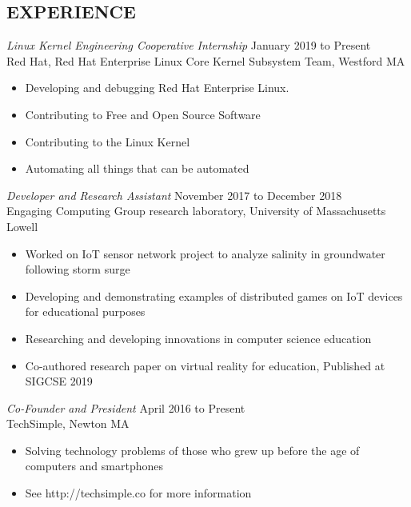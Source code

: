 \documentclass[margin]{res}
\begin{document}
\begin{resume}
\section{EXPERIENCE} {\sl Linux Kernel Engineering Cooperative Internship} \hfill January 2019 to Present\\
                Red Hat, 
                Red Hat Enterprise Linux Core Kernel Subsystem Team, Westford MA
                 \begin{itemize}  \itemsep -2pt %
                 \item Developing and debugging Red Hat Enterprise Linux. 
                \item   Contributing to Free and Open Source Software
                \item Contributing to the Linux Kernel
                \item Automating all things that can be automated
                \end{itemize}
 
                {\sl Developer and Research Assistant} \hfill            November 2017 to December 2018 \\
                Engaging Computing Group research laboratory, University of Massachusetts Lowell
                 \begin{itemize}  \itemsep -2pt %
                 \item Worked on IoT sensor network project to analyze salinity in groundwater following storm surge
                 \item Developing and demonstrating examples of distributed games on IoT devices for educational purposes
				  \item Researching and developing innovations in computer science education
				  \item Co-authored research paper on virtual reality for education, Published at SIGCSE 2019
                 \end{itemize} 
                {\sl Co-Founder and President} \hfill        April 2016 to Present \\
                TechSimple, Newton MA
                  \begin{itemize}   \itemsep -2pt %
                   \item Solving technology problems of those who grew up before the age of computers and smartphones
                   \item See http://techsimple.co for more information
                   \end{itemize} 


\end{resume}
\end{document}
